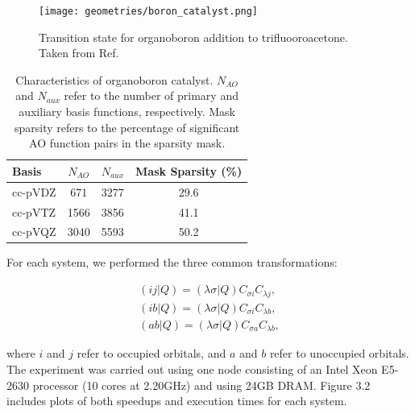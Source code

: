 \begin{figure}[H] 
\centering
\texttt{[image: geometries/boron\_catalyst.png]} \caption{Transition state for organoboron addition to trifluooroacetone. Taken from Ref. \cite{Lee:2016}} 
\label{fig:databases} \end{figure}

\begingroup
\begin{table}[H]
\centering
\renewcommand{\baselinestretch}{1}
\caption{Characteristics of organoboron catalyst.
$N_{AO}$ and $N_{aux}$ refer to the number of primary and auxiliary basis functions, respectively.
Mask sparsity refers to the percentage of significant AO function pairs in the sparsity mask.}
\begin{tabular}{l ccc}
\multicolumn{1}{l}{\textbf{Basis}} &
\multicolumn{1}{c}{\textbf{$N_{AO}$}} &
\multicolumn{1}{c}{\textbf{$N_{aux}$}} &
\multicolumn{1}{c}{\textbf{Mask Sparsity (\%)}} \\
\hline
cc-pVDZ   & 671  & 3277 & 29.6 \\          
cc-pVTZ   & 1566 & 3856 & 41.1 \\          
cc-pVQZ   & 3040 & 5593 & 50.2 \\          
\end{tabular}
\end{table}
\endgroup


\noindent For each system, we performed the three common transformations:

\begin{align} 
(i j | Q) = (\lambda \sigma | Q) C_{\sigma i} C_{\lambda j} , \\
(i b | Q) = (\lambda \sigma | Q) C_{\sigma i} C_{\lambda b} , \\
(a b | Q) = (\lambda \sigma | Q) C_{\sigma a} C_{\lambda b} , 
\end{align}

\noindent where $i$ and $j$ refer to occupied orbitals, and $a$ and $b$ refer to unoccupied orbitals.
The experiment was carried out using one node consisting of an Intel Xeon E5-2630 processor 
(10 cores at 2.20GHz) and using 24GB DRAM. Figure 3.2 includes plots of both speedups and execution times for each system.

